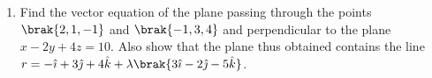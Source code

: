 \begin{enumerate}[label=\thesubsection.\arabic*, ref=\thesubsection.\theenumi, itemsep=3ex]
\medskip
The following code verifies the result
\begin{lstlisting}[frame=single, basicstyle=\rmfamily, escapeinside={(*@}{@*)}]
(*@\makebox[\dimexpr\linewidth-2\fboxsep-2\fboxrule\relax][c]{codes/Q32.py}@*)
\end{lstlisting}

\item
Find the vector equation of the plane passing through the points $\brak{2,1,-1}$ and $\brak{-1,3,4}$ and perpendicular to the plane $x - 2y + 4z = 10$. Also show that the plane thus obtained contains the line $\vec{r} = -\hat{\imath} + 3\hat{\jmath} + 4\hat{k} + \lambda\brak{3\hat{\imath} - 2\hat{\jmath} - 5\hat{k}}$.


\end{enumerate}
